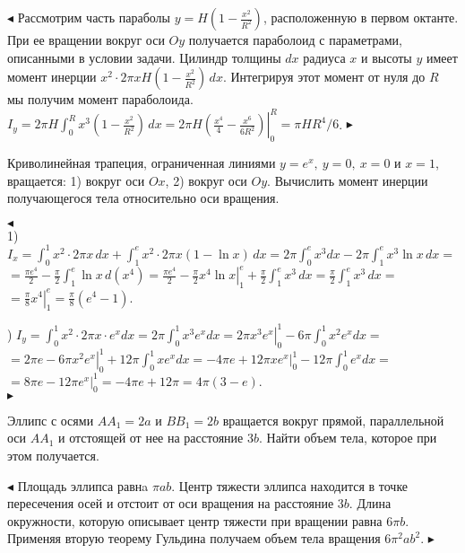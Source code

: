 \documentclass[a5paper,10pt]{article}
\begin{document}
\smallskip
\noindent $\blacktriangleleft$ Рассмотрим часть параболы
$\displaystyle y=H\left(1-\frac{x^2}{R^2}\right)$, расположенную в первом октанте.
При ее вращении вокруг оси $Oy$ получается параболоид с параметрами,
описанными в условии задачи. Цилиндр толщины $dx$ радиуса $x$ и высоты $y$
имеет момент инерции $\displaystyle x^2\cdot2\pi xH\left(1-\frac{x^2}{R^2}\right)\,dx$.
Интегрируя этот момент от нуля до $R$ мы получим момент параболоида.\\
$\displaystyle I_y=2\pi H\int_0^Rx^3\left(1-\frac{x^2}{R^2}\right)\,dx=
2\pi H\left.\left(\frac{x^4}{4}-\frac{x^6}{6R^2}\right)\right|_0^R=\pi HR^4/6$.
$\blacktriangleright$

\medskip
{} Криволинейная трапеция, ограниченная линиями
$y=e^x,\ y=0,\ x=0$ и $x=1$, вращается:
1) вокруг оси $Ox$, 2) вокруг оси $Oy$. Вычислить момент инерции
получающегося тела относительно оси вращения.

\smallskip
\noindent $\blacktriangleleft$\\
1) $\displaystyle I_x=\int_0^1 x^2\cdot2\pi x\,dx+
\int_1^e x^2\cdot2\pi x(1-\ln x)\,dx=
2\pi\int_0^e x^3dx-2\pi\int_1^e x^3\ln x\,dx=$\\
$\displaystyle =\frac{\pi e^4}{2}-\frac{\pi}{2}\int_1^e\ln x\,d(x^4)=
\frac{\pi e^4}{2}-\left.\frac{\pi}{2}x^4\ln x\right|_1^e+
\frac{\pi}{2}\int_1^ex^3\,dx=\frac{\pi}{2}\int_1^ex^3\,dx=$\\
$\displaystyle =\left.\frac{\pi}{8}x^4\right|_1^e=\frac{\pi}{8}(e^4-1)$.

) $\displaystyle I_y=\int_0^1 x^2\cdot2\pi x\cdot e^xdx=
2\pi\int_0^1 x^3e^xdx=
2\pi\left.x^3e^x\right|_0^1-6\pi\int_0^1x^2e^xdx=$\\
$\displaystyle =2\pi e-6\pi\left.x^2e^x\right|_0^1+12\pi \int_0^1xe^xdx=
-4\pi e+12\pi\left.xe^x\right|_0^1-12\pi\int_0^1e^xdx=$\\
$\displaystyle =8\pi e-12\pi\left.e^x\right|_0^1=-4\pi e+12\pi=4\pi(3-e)$.\\
$\blacktriangleright$

\medskip
{} Эллипс с осями $AA_1=2a$ и $BB_1=2b$
вращается вокруг прямой, параллельной оси $AA_1$ и отстоящей от нее
на расстояние $3b$. Найти объем тела, которое при этом получается.

\smallskip
\noindent $\blacktriangleleft$ Площадь эллипса равнa $\pi ab$.
Центр тяжести эллипса находится в точке пересечения осей и
отстоит от оси вращения на расстояние $3b$. Длина окружности,
которую описывает центр тяжести при вращении равна $6\pi b$.
Применяя вторую теорему Гульдина получаем объем тела вращения
$6\pi^2 ab^2$. $\blacktriangleright$
\end{document}
